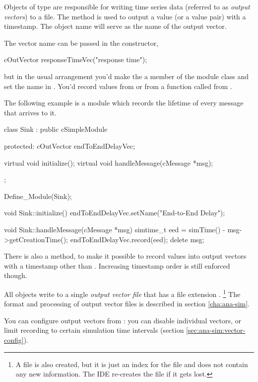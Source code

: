 Objects of type  are responsible for writing time series
data (referred to as \textit{output vectors}) to a file. The 
method is used to output a value (or a value pair) with a timestamp.
The object name will serve as the name of the output vector.

The vector name can be passed in the constructor,

\begin{cpp}
cOutVector responseTimeVec("response time");
\end{cpp}

but in the usual arrangement you'd make the  a member
of the module class and set the name in . You'd
record values from  or from a function called from
.

The following example is a  module which records the lifetime
of every message that arrives to it.

\begin{cpp}
class Sink : public cSimpleModule
{
  protected:
    cOutVector endToEndDelayVec;

    virtual void initialize();
    virtual void handleMessage(cMessage *msg);
};

Define_Module(Sink);

void Sink::initialize()
{
    endToEndDelayVec.setName("End-to-End Delay");
}

void Sink::handleMessage(cMessage *msg)
{
    simtime_t eed = simTime() - msg->getCreationTime();
    endToEndDelayVec.record(eed);
    delete msg;
}
\end{cpp}

There is also a  method, to make it
possible to record values into output vectors with a timestamp other than
. Increasing timestamp order is still enforced though.

All  objects write to a single \textit{output vector file}
that has a file extension .
  \footnote{A  file is also created, but it is just an index for
  the  file and does not contain any new information. The IDE
  re-creates the  file if it gets lost.}
The format and processing of output vector files is described in section
\ref{cha:ana-sim}.

You can configure output vectors from :
you can disable individual vectors, or limit recording to certain
simulation time intervals (section \ref{sec:ana-sim:vector-config}).

